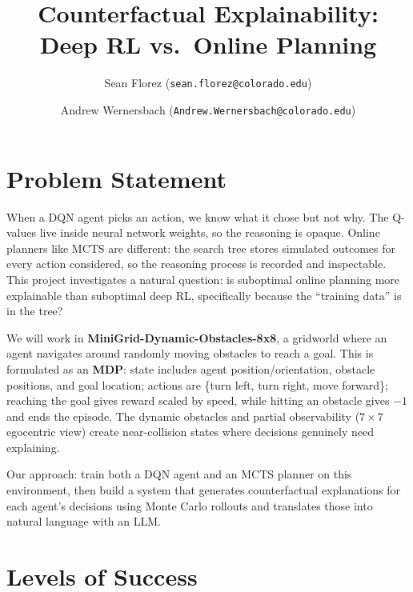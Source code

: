 \documentclass[11pt]{article}
\title{\vspace{-2em}Counterfactual Explainability: Deep RL vs.\ Online Planning\vspace{-1em}}
\author{Sean Florez (\texttt{sean.florez@colorado.edu}) \and Andrew Wernersbach (\texttt{Andrew.Wernersbach@colorado.edu})}
\date{}
\begin{document}
\maketitle
\thispagestyle{empty}

\section*{Problem Statement}

When a DQN agent picks an action, we know what it chose but not why.
The Q-values live inside neural network weights, so the reasoning is opaque.
Online planners like MCTS are different: the search tree stores simulated outcomes for every action considered, so the reasoning process is recorded and inspectable.
This project investigates a natural question: is suboptimal online planning more explainable than suboptimal deep RL, specifically because the ``training data'' is in the tree?

We will work in \textbf{MiniGrid-Dynamic-Obstacles-8x8}, a gridworld where an agent navigates around randomly moving obstacles to reach a goal.
This is formulated as an \textbf{MDP}: state includes agent position/orientation, obstacle positions, and goal location; actions are \{turn left, turn right, move forward\}; reaching the goal gives reward scaled by speed, while hitting an obstacle gives $-1$ and ends the episode.
The dynamic obstacles and partial observability ($7 \times 7$ egocentric view) create near-collision states where decisions genuinely need explaining.

Our approach: train both a DQN agent and an MCTS planner on this environment, then build a system that generates counterfactual explanations for each agent's decisions using Monte Carlo rollouts and translates those into natural language with an LLM.

\section*{Levels of Success}
\end{document}
